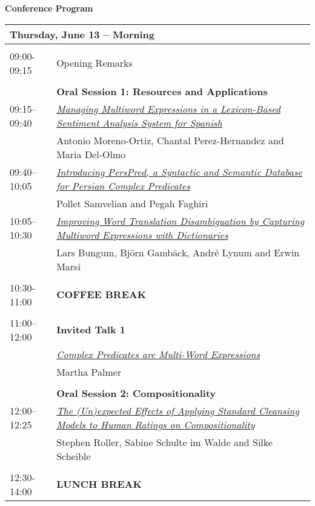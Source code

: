 \setlength{\parindent}{0in}
\setlength{\parskip}{2ex}
\renewcommand{\baselinestretch}{0.87}

\begin{center}
{\Large \bf
  Conference Program
}
\end{center}
\vspace{3mm}
\begin{tabular}{p{20mm}p{128mm}}
\hline
\multicolumn{2}{l}{\bf Thursday, June 13 -- Morning} \\
\hline
\\
09:00-09:15 & Opening Remarks \\
\\
 & {\bf Oral Session 1: Resources and Applications} \\
09:15--09:40 & \hyperlink{page.1}{\em Managing Multiword Expressions in a Lexicon-Based Sentiment Analysis System for Spanish}\\
         & Antonio Moreno-Ortiz, Chantal Perez-Hernandez and Maria Del-Olmo \\
09:40--10:05 & \hyperlink{page.11}{\em Introducing {P}ers{P}red, a Syntactic and Semantic Database for {P}ersian Complex Predicates}\\
         & Pollet Samvelian and Pegah Faghiri \\
10:05--10:30 & \hyperlink{page.21}{\em Improving Word Translation Disambiguation by Capturing Multiword Expressions with Dictionaries}\\
         & Lars Bungum, Bj\"{o}rn Gamb\"{a}ck, Andr\'{e} Lynum and Erwin Marsi \\
\\
10:30-11:00 & {\bf COFFEE BREAK} \\
\\
11:00--12:00 & {\bf Invited Talk 1} \\
 & \hyperlink{page.31}{\em Complex Predicates are Multi-Word Expressions}\\
         & Martha Palmer \\
\\
 & {\bf Oral Session 2: Compositionality} \\
12:00--12:25 & \hyperlink{page.32}{\em The (Un)expected Effects of Applying Standard Cleansing Models to Human Ratings on Compositionality}\\
         & Stephen Roller, Sabine Schulte im Walde and Silke Scheible \\
\\
12:30-14:00 & {\bf LUNCH BREAK} \\
\end{tabular}

